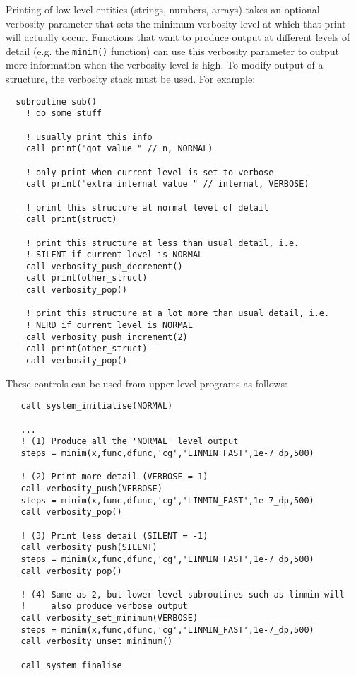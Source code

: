 Printing of low-level entities (strings, numbers, arrays) takes an optional
verbosity parameter that sets the minimum verbosity level at which that
print will actually occur.  Functions that want to produce output at
different levels of detail (e.g. the \texttt{minim()} function) can use
this verbosity parameter to output more information when the verbosity
level is high.  To modify output of a structure, the verbosity stack
must be used.  For example:

\begin{boxedminipage}{\textwidth}
\begin{verbatim}
  subroutine sub()
    ! do some stuff

    ! usually print this info
    call print("got value " // n, NORMAL) 

    ! only print when current level is set to verbose
    call print("extra internal value " // internal, VERBOSE) 

    ! print this structure at normal level of detail
    call print(struct)

    ! print this structure at less than usual detail, i.e.
    ! SILENT if current level is NORMAL
    call verbosity_push_decrement()
    call print(other_struct)
    call verbosity_pop()

    ! print this structure at a lot more than usual detail, i.e.
    ! NERD if current level is NORMAL
    call verbosity_push_increment(2)
    call print(other_struct)
    call verbosity_pop()

\end{verbatim}
\end{boxedminipage}

These controls can be used from upper level programs as follows:

\begin{boxedminipage}{\textwidth}
\begin{verbatim}
   call system_initialise(NORMAL)

   ...
   ! (1) Produce all the 'NORMAL' level output
   steps = minim(x,func,dfunc,'cg','LINMIN_FAST',1e-7_dp,500)

   ! (2) Print more detail (VERBOSE = 1)
   call verbosity_push(VERBOSE)
   steps = minim(x,func,dfunc,'cg','LINMIN_FAST',1e-7_dp,500)
   call verbosity_pop()

   ! (3) Print less detail (SILENT = -1)
   call verbosity_push(SILENT)
   steps = minim(x,func,dfunc,'cg','LINMIN_FAST',1e-7_dp,500)
   call verbosity_pop()

   ! (4) Same as 2, but lower level subroutines such as linmin will 
   !     also produce verbose output
   call verbosity_set_minimum(VERBOSE)
   steps = minim(x,func,dfunc,'cg','LINMIN_FAST',1e-7_dp,500)
   call verbosity_unset_minimum()

   call system_finalise
\end{verbatim}
\end{boxedminipage}
